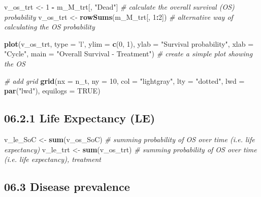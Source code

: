 \documentclass[]{article}
\newenvironment{Shaded}{\begin{snugshade}}{\end{snugshade}}
\newcommand{\KeywordTok}[1]{\textcolor[rgb]{0.13,0.29,0.53}{\textbf{#1}}}
\newcommand{\DataTypeTok}[1]{\textcolor[rgb]{0.13,0.29,0.53}{#1}}
\newcommand{\DecValTok}[1]{\textcolor[rgb]{0.00,0.00,0.81}{#1}}
\newcommand{\StringTok}[1]{\textcolor[rgb]{0.31,0.60,0.02}{#1}}
\newcommand{\CommentTok}[1]{\textcolor[rgb]{0.56,0.35,0.01}{\textit{#1}}}
\newcommand{\OtherTok}[1]{\textcolor[rgb]{0.56,0.35,0.01}{#1}}
\newcommand{\OperatorTok}[1]{\textcolor[rgb]{0.81,0.36,0.00}{\textbf{#1}}}
\newcommand{\NormalTok}[1]{#1}
\begin{document}
\begin{Shaded}
\begin{Highlighting}[]
\NormalTok{v_os_trt <-}\StringTok{ }\DecValTok{1} \OperatorTok{-}\StringTok{ }\NormalTok{m_M_trt[, }\StringTok{"Dead"}\NormalTok{]    }\CommentTok{# calculate the overall survival (OS) probability}
\NormalTok{v_os_trt <-}\StringTok{ }\KeywordTok{rowSums}\NormalTok{(m_M_trt[, }\DecValTok{1}\OperatorTok{:}\DecValTok{2}\NormalTok{])  }\CommentTok{# alternative way of calculating the OS probability}

\KeywordTok{plot}\NormalTok{(v_os_trt, }\DataTypeTok{type =} \StringTok{'l'}\NormalTok{, }
     \DataTypeTok{ylim =} \KeywordTok{c}\NormalTok{(}\DecValTok{0}\NormalTok{, }\DecValTok{1}\NormalTok{),}
     \DataTypeTok{ylab =} \StringTok{"Survival probability"}\NormalTok{,}
     \DataTypeTok{xlab =} \StringTok{"Cycle"}\NormalTok{,}
     \DataTypeTok{main =} \StringTok{"Overall Survival - Treatment"}\NormalTok{)  }\CommentTok{# create a simple plot showing the OS}

\CommentTok{# add grid }
\KeywordTok{grid}\NormalTok{(}\DataTypeTok{nx =}\NormalTok{ n_t, }\DataTypeTok{ny =} \DecValTok{10}\NormalTok{, }\DataTypeTok{col =} \StringTok{"lightgray"}\NormalTok{, }\DataTypeTok{lty =} \StringTok{"dotted"}\NormalTok{, }\DataTypeTok{lwd =} \KeywordTok{par}\NormalTok{(}\StringTok{"lwd"}\NormalTok{), }
     \DataTypeTok{equilogs =} \OtherTok{TRUE}\NormalTok{) }
\end{Highlighting}
\end{Shaded}

\subsection{06.2.1 Life Expectancy (LE)}\label{life-expectancy-le}

\begin{Shaded}
\begin{Highlighting}[]
\NormalTok{v_le_SoC <-}\StringTok{ }\KeywordTok{sum}\NormalTok{(v_os_SoC)  }\CommentTok{# summing probability of OS over time (i.e. life expectancy)}
\NormalTok{v_le_trt <-}\StringTok{ }\KeywordTok{sum}\NormalTok{(v_os_trt)  }\CommentTok{# summing probability of OS over time (i.e. life expectancy), treatment}
\end{Highlighting}
\end{Shaded}

\subsection{06.3 Disease prevalence}\label{disease-prevalence}
\end{document}
